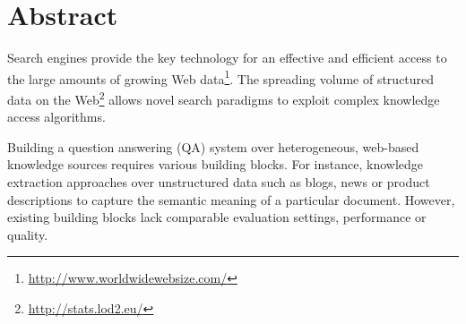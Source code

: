 \chapter*{Abstract}

Search engines provide the key technology for an effective and efficient access to the large amounts of growing Web data\footnote{\url{http://www.worldwidewebsize.com/}}. 
The spreading volume of structured data on the Web\footnote{\url{http://stats.lod2.eu/}} allows novel search paradigms to exploit complex knowledge access algorithms.

Building a question answering (QA) system over heterogeneous, web-based knowledge sources requires various building blocks.
For instance, knowledge extraction approaches over unstructured data such as blogs, news or product descriptions to capture the semantic meaning of a particular document.
However, existing building blocks lack comparable evaluation settings, performance or quality. 

